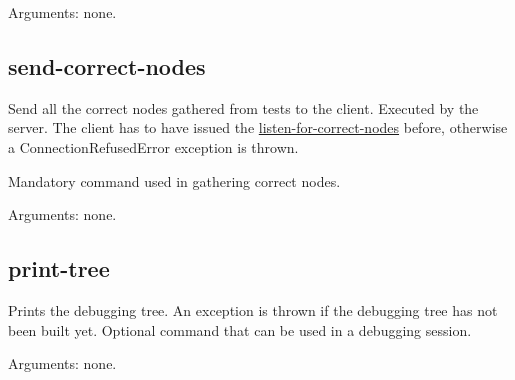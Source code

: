 Arguments: none.
\subsection{send-correct-nodes}
\label{command:send-correct-nodes}
Send all the correct nodes gathered from tests to the client.
Executed by the server.
The client has to have issued the \hyperref[command:listen-for-correct-nodes]{listen-for-correct-nodes} before, otherwise a ConnectionRefusedError exception is thrown.

Mandatory command used in gathering correct nodes.

Arguments: none.
\subsection{print-tree}
\label{command:print-tree}
Prints the debugging tree.
An exception is thrown if the debugging tree has not been built yet. 
Optional command that can be used in a debugging session.

Arguments: none.